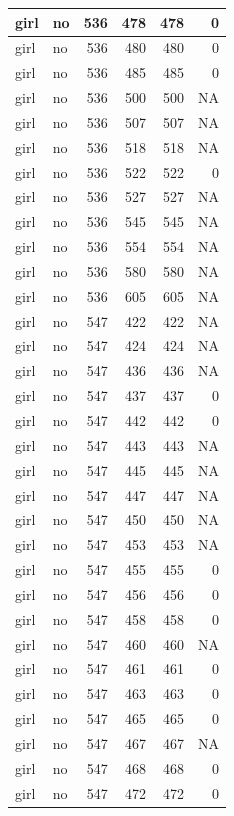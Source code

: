 \documentclass[man]{apa6}
\begin{document}
\begin{tabular}{l|l|r|r|r|r}
\hline
girl & no & 536 & 478 & 478 & 0\\
\hline
girl & no & 536 & 480 & 480 & 0\\
\hline
girl & no & 536 & 485 & 485 & 0\\
\hline
girl & no & 536 & 500 & 500 & NA\\
\hline
girl & no & 536 & 507 & 507 & NA\\
\hline
girl & no & 536 & 518 & 518 & NA\\
\hline
girl & no & 536 & 522 & 522 & 0\\
\hline
girl & no & 536 & 527 & 527 & NA\\
\hline
girl & no & 536 & 545 & 545 & NA\\
\hline
girl & no & 536 & 554 & 554 & NA\\
\hline
girl & no & 536 & 580 & 580 & NA\\
\hline
girl & no & 536 & 605 & 605 & NA\\
\hline
girl & no & 547 & 422 & 422 & NA\\
\hline
girl & no & 547 & 424 & 424 & NA\\
\hline
girl & no & 547 & 436 & 436 & NA\\
\hline
girl & no & 547 & 437 & 437 & 0\\
\hline
girl & no & 547 & 442 & 442 & 0\\
\hline
girl & no & 547 & 443 & 443 & NA\\
\hline
girl & no & 547 & 445 & 445 & NA\\
\hline
girl & no & 547 & 447 & 447 & NA\\
\hline
girl & no & 547 & 450 & 450 & NA\\
\hline
girl & no & 547 & 453 & 453 & NA\\
\hline
girl & no & 547 & 455 & 455 & 0\\
\hline
girl & no & 547 & 456 & 456 & 0\\
\hline
girl & no & 547 & 458 & 458 & 0\\
\hline
girl & no & 547 & 460 & 460 & NA\\
\hline
girl & no & 547 & 461 & 461 & 0\\
\hline
girl & no & 547 & 463 & 463 & 0\\
\hline
girl & no & 547 & 465 & 465 & 0\\
\hline
girl & no & 547 & 467 & 467 & NA\\
\hline
girl & no & 547 & 468 & 468 & 0\\
\hline
girl & no & 547 & 472 & 472 & 0\\

\end{tabular}
\end{document}
